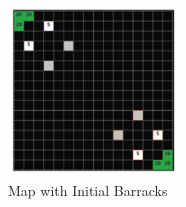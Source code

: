 \begin{figure}[htb]
    \centering
    \includegraphics[width=0.4\textwidth]{images/map_with_initial_barracks.png}
    \caption{Map with Initial Barracks}
    \label{figure:map_with_initial_barracks}
\end{figure}